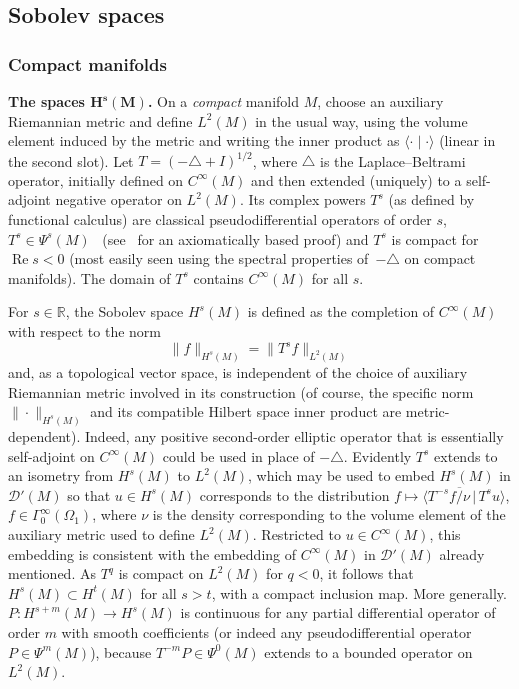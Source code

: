 \documentclass[11pt]{article}
\numberwithin{equation}{section}
\numberwithin{equation}{section}
\newcommand{\RR}{{\mathbb R}}
\newcommand{\GoinX}[1]{\Gamma_0^\infty({#1})}
\newcommand{\DD}{{\mathscr D}}
\renewcommand{\Re}{\operatorname{Re}}
\newcommand{\ip}[2]{{\big\langle #1 \, \big|\, #2\big\rangle}}
\begin{document}
 \subsection{Sobolev spaces}

 \subsubsection{Compact manifolds}

 {\bf The spaces $\mathbf{H^s(M)}$.}
 On a \emph{compact} manifold $M$, choose an auxiliary Riemannian metric and define $L^2(M)$ in the usual way, using the volume element induced by the metric and writing the inner product as $\langle\cdot\mid\cdot\rangle$ (linear in the second slot). Let $T=(-\triangle + I)^{1/2}$, where $\triangle$ is the Laplace--Beltrami operator, initially defined on $C^\infty(M)$ and then extended (uniquely) to a self-adjoint negative operator on $L^2(M)$.
 Its complex powers $T^s$ (as defined by functional calculus) are classical pseudodifferential operators of order $s$, $T^s\in\Psi^s(M)$~\cite{Seeley:1967} (see~\cite{Amman_etal:2004} for an axiomatically based proof) and $T^s$ is compact for $\Re s<0$ (most easily seen using the spectral properties of~$-\triangle$ on compact manifolds). The domain of $T^s$ contains $C^\infty(M)$ for all $s$.

 For $s\in\RR$, the Sobolev space $H^s(M)$ is defined as the completion of $C^\infty(M)$ with respect to the norm
 \begin{equation*}
 	\|f\|_{H^s(M)} = \| T^s f\|_{L^2(M)}
 \end{equation*}
 and, as a topological vector space, is independent of the choice of auxiliary Riemannian metric involved in its construction (of course, the specific norm $\|\cdot\|_{H^s(M)}$
 and its compatible Hilbert space inner product
 are metric-dependent). Indeed, any positive second-order elliptic operator that is essentially self-adjoint on $C^\infty(M)$ could be used in place of $-\triangle$.
 Evidently $T^s$ extends to an isometry from $H^s(M)$ to $L^2(M)$, which may be used to embed $H^s(M)$ in $\DD'(M)$ so that $u \in H^s(M)$ corresponds to the distribution $f\mapsto \ip{T^{-s}\overline{f/\nu}}{T^su}$, $f\in\GoinX{\Omega_1}$, where $\nu$ is the density corresponding to the
 volume element of the auxiliary metric used to define $L^2(M)$. Restricted to $u\in C^\infty(M)$, this embedding is consistent with the embedding of $C^\infty(M)$ in $\DD'(M)$ already mentioned.
 As $T^q$ is compact on $L^2(M)$ for $q<0$, it follows that $H^s(M)\subset H^t(M)$ for all $s>t$, with a compact inclusion map. More generally. $P\colon H^{s+m}(M)\to H^s(M)$ is continuous for any partial differential operator of order $m$ with smooth coefficients (or indeed any pseudodifferential operator $P\in \Psi^{m}(M)$), because $T^{-m}P\in \Psi^0(M)$ extends to a bounded operator on $L^2(M)$.
\end{document}
